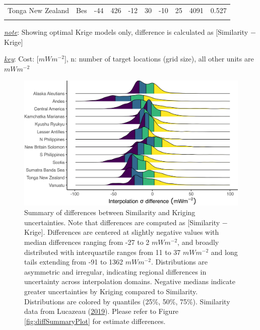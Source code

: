 \begin{table}
{\begin{threeparttable}
\begin{tabular}[t]{llrrrrrrrr}
Tonga New Zealand & Bes & -44 & 426 & -12 & 30 & -10 & 25 & 4091 & 0.527\\
\cellcolor{gray!6}{Vanuatu} & \cellcolor{gray!6}{Lin} & \cellcolor{gray!6}{-56} & \cellcolor{gray!6}{1362} & \cellcolor{gray!6}{-12} & \cellcolor{gray!6}{27} & \cellcolor{gray!6}{-3} & \cellcolor{gray!6}{63} & \cellcolor{gray!6}{2508} & \cellcolor{gray!6}{0.502}\\
\bottomrule
\end{tabular}
\begin{tablenotes}
\item \uline{\textit{note}}: Showing optimal Krige models only, difference is calculated as [Similarity $-$ Krige]
\item \uline{\textit{key}}: Cost: [$mWm^{-2}$], n: number of target locations (grid size), all other units are $mWm^{-2}$
\end{tablenotes}
\end{threeparttable}}
\end{table}



\begin{figure}[htbp]

{\centering \includegraphics[width=1\linewidth,]{assets/figs/chpt3/interpSigmaDiffSummary} 

}

\caption[Summary of differences between Similarity and Kriging uncertainties]{Summary of differences between Similarity and Kriging uncertainties. Note that differences are computed as {[}Similarity \(-\) Krige{]}. Differences are centered at slightly negative values with median differences ranging from -27 to 2 \(mWm^{-2}\), and broadly distributed with interquartile ranges from 11 to 37 \(mWm^{-2}\) and long tails extending from -91 to 1362 \(mWm^{-2}\). Distributions are asymmetric and irregular, indicating regional differences in uncertainty across interpolation domains. Negative medians indicate greater uncertainties by Kriging compared to Similarity. Distributions are colored by quantiles (25\%, 50\%, 75\%). Similarity data from Lucazeau (\protect\hyperlink{ref-lucazeau2019}{2019}). Please refer to Figure \ref{fig:diffSummaryPlot} for estimate differences.}\label{fig:sigmaDiffSummaryPlot}
\end{figure}

